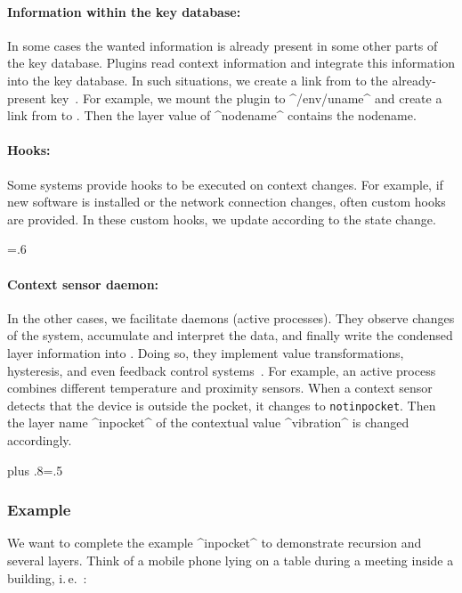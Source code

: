 \paragraph{Information within the key database:}
In some cases the wanted information is already present in some other parts of the key database.
Plugins read context information and integrate this information into the key database.
In such situations, we create a link from  to the already-present key~\cite{raab2016unanticipated}.
For example, we mount the plugin  to ^/env/uname^ and create a link from  to .
Then the layer value of ^nodename^ contains the nodename.

\paragraph{Hooks:}
Some systems provide hooks to be executed on context changes.
For example, if new software is installed or the network connection changes, often custom hooks are provided.
In these custom hooks, we update  according to the state change.%
{\parfillskip=0pt \emergencystretch=.6\textwidth \par}

\paragraph{Context sensor daemon:}
In the other cases, we facilitate daemons (active processes).
They observe changes of the system, accumulate and interpret the data, and finally write the condensed layer information into .
Doing so, they implement value transformations, hysteresis, and even feedback control systems~\cite{raab2016unanticipated}.
For example, an active process combines different temperature and proximity sensors.
When a context sensor detects that the device is outside the pocket, it changes  to \lstinline[breaklines=false]^notinpocket^.
Then the layer name ^inpocket^ of the contextual value ^vibration^ is changed accordingly.%
{\parfillskip=0pt plus .8\textwidth \emergencystretch=.5\textwidth \par}




\subsubsection{Example}

We want to complete the example ^inpocket^ to demonstrate recursion and several layers.
Think of a mobile phone lying on a table during a meeting inside a building, i.\,e.~\cite{raab2016unanticipated}:

